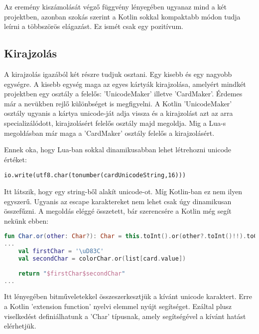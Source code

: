 Az eremény kiszámolását végző függvény lényegében ugyanaz mind a két projektben, azonban szokás szerint a Kotlin sokkal kompaktabb módon tudja leírni a többszörös elágazást. Ez ismét csak egy pozitívum. 

\subsection{Kirajzolás}

A kirajzolás igazából két részre tudjuk osztani. Egy kisebb és egy nagyobb egységre. A kisebb egység maga az egyes kártyák kirajzolása, amelyért mindkét projektben egy osztály a felelős: 'UnicodeMaker' illetve 'CardMaker'. Érdemes már a nevükben rejlő különbséget is megfigyelni. A Kotlin 'UnicodeMaker' osztály ugyanis a kártya unicode-ját adja vissza és a kirajzolást azt az arra specializálódott, kirajzolásért felelős osztály majd megoldja. Mig a Lua-s megoldásban már maga a 'CardMaker' osztály felelős a kirajzolásért. 

Ennek oka, hogy Lua-ban sokkal dinamikusabban lehet létrehozni unicode értéket:
\scriptsize
\begin{lstlisting}[style=Lua]
 io.write(utf8.char(tonumber(cardUnicodeString,16)))
\end{lstlisting}
\normalsize
Itt látszik, hogy egy string-ből alakít unicode-ot. Míg Kotlin-ban ez nem ilyen egyszerű. Ugyanis az escape karaktereket nem lehet csak úgy dinamikusan összefűzni. A megoldás eléggé összetett, bár szerencsére a Kotlin még segít nekünk ebben:
\scriptsize
\begin{lstlisting}[language = Kotlin]
fun Char.or(other: Char?): Char = this.toInt().or(other?.toInt()!!).toChar()
...
	val firstChar = '\uD83C'
	val secondChar = colorChar.or(list[card.value])
	
	return "$firstChar$secondChar"
...
\end{lstlisting}
\normalsize
Itt lényegében bitműveletekkel összeszerkesztjük a kívánt unicode karaktert. Erre a Kotlin 'extension function' nyelvi elemmel nyújt segítséget. Ezáltal plusz viselkedést definiálhatunk a 'Char' típusnak, amely segítségével a kívánt hatást elérhetjük.

\bigskip

